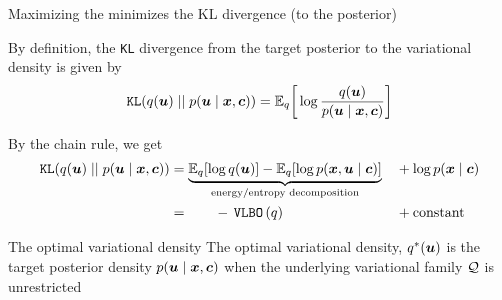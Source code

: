 \documentclass[10pt]{beamer}
\begin{document}
\begin{frame}{Maximizing the \VLBO minimizes the KL divergence \tiny (to the posterior)}  


By definition, the \texttt{KL} divergence from the target posterior to the variational density is given by
\begin{equation*}
\texttt{KL} (q(\+u) \; || \; p(\+u \cond \+x, \+c)) =  \E_q \bigg[\log \df{q(\+u )}{p(\+u \cond \+x, \+c)} \bigg] 
\end{equation*}

 


By the chain rule, we get 
\begin{align*} 
 \texttt{KL} (q(\+u) \; || \; p(\+u \cond \+x, \+c)) & = \explaintermbrace{energy/entropy decomposition}{ \E_q[\log q(\+u )]  - \E_q[ \log p(\+x,\+u \cond \+c)]} &&+\log p(\+x \cond \+c) \\
 & = \hphantom{blah} -\VLBO(q)  && +  \text{constant} 
 \end{align*}
 

\begin{block}{The optimal variational density}
The optimal variational density, $q^*(\+u)$ is the target posterior density $p(\+u \cond \+x, \+c)$ when the underlying variational family $\Q$ is unrestricted  
\end{block}

\end{frame}






%
%
%
\end{document}
